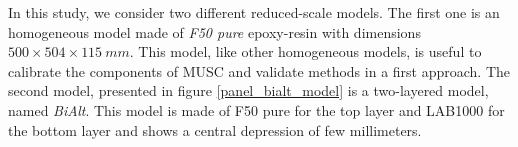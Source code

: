 \documentclass[manuscript,revised]{geophysics}
\begin{document}
\noindent In this study, we consider two different reduced-scale models. The first one is an homogeneous model made of \textit{F50 pure} epoxy-resin with dimensions $500 \times 504 \times 115\ mm$. This model, like other homogeneous models, is useful to calibrate the components of MUSC and validate methods in a first approach. The second model, presented in figure \ref{panel_bialt_model} is a two-layered model, named \textit{BiAlt}. This model is made of F50 pure for the top layer and LAB1000 for the bottom layer and shows a central depression of few millimeters.


\end{document}
